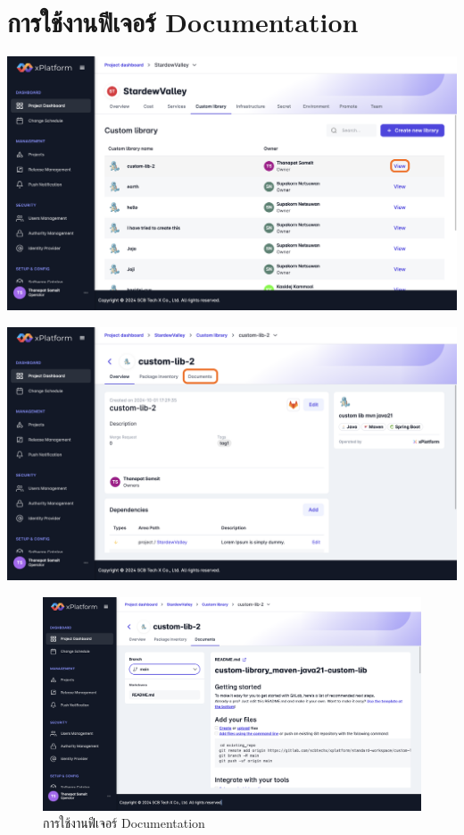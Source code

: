 \section{การใช้งานฟีเจอร์ Documentation}
\begin{center}
    \includegraphics[width=\linewidth]{resources/pages/documentation/1.png}

    \vspace{1in}

    \includegraphics[width=\linewidth]{resources/pages/documentation/2.png}
\end{center}

\begin{figure}[H]
    \begin{center}
        \includegraphics[width=\linewidth]{resources/pages/documentation/3.png}
    \end{center}
    \caption[การใช้งานฟีเจอร์ Documentation]{การใช้งานฟีเจอร์ Documentation}
  \label{fig:documentation}
\end{figure}